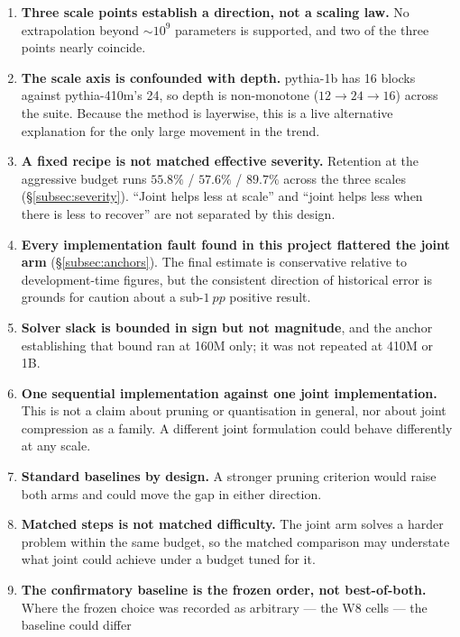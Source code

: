 \begin{enumerate}\setlength{\itemsep}{2pt}
  \item \textbf{Three scale points establish a direction, not a scaling law.} No
        extrapolation beyond $\sim\!10^{9}$ parameters is supported, and two of the three
        points nearly coincide.
  \item \textbf{The scale axis is confounded with depth.} pythia-1b has 16 blocks against
        pythia-410m's 24, so depth is non-monotone ($12 \to 24 \to 16$) across the suite.
        Because the method is layerwise, this is a live alternative explanation for the only
        large movement in the trend.
  \item \textbf{A fixed recipe is not matched effective severity.} Retention at the aggressive
        budget runs $55.8\%$ / $57.6\%$ / $89.7\%$ across the three scales
        (\S\ref{subsec:severity}). ``Joint helps less at scale'' and ``joint helps less when
        there is less to recover'' are not separated by this design.
  \item \textbf{Every implementation fault found in this project flattered the joint arm}
        (\S\ref{subsec:anchors}). The final estimate is conservative relative to
        development-time figures, but the consistent direction of historical error is grounds
        for caution about a sub-$\SI{1}{pp}$ positive result.
  \item \textbf{Solver slack is bounded in sign but not magnitude}, and the anchor
        establishing that bound ran at 160M only; it was not repeated at 410M or 1B.
  \item \textbf{One sequential implementation against one joint implementation.} This is not
        a claim about pruning or quantisation in general, nor about joint compression as a
        family. A different joint formulation could behave differently at any scale.
  \item \textbf{Standard baselines by design.} A stronger pruning criterion would raise both
        arms and could move the gap in either direction.
  \item \textbf{Matched steps is not matched difficulty.} The joint arm solves a harder
        problem within the same budget, so the matched comparison may understate what joint
        could achieve under a budget tuned for it.
  \item \textbf{The confirmatory baseline is the frozen order, not best-of-both.} Where the
        frozen choice was recorded as arbitrary --- the W8 cells --- the baseline could differ

\end{enumerate}
